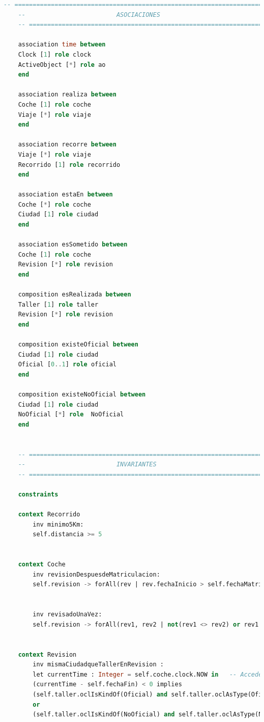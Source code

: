 \documentclass[12pt.a4paper]{article}
\begin{document}
\begin{lstlisting}[style = useNormal,language=SQL, caption={Modelo de Sistema de Coches en USE}]
    -- =====================================================================
    --                         ASOCIACIONES 
    -- =====================================================================
    
    association time between
    Clock [1] role clock
    ActiveObject [*] role ao
    end
    
    association realiza between
    Coche [1] role coche
    Viaje [*] role viaje
    end
    
    association recorre between
    Viaje [*] role viaje
    Recorrido [1] role recorrido
    end
    
    association estaEn between
    Coche [*] role coche
    Ciudad [1] role ciudad
    end
    
    association esSometido between
    Coche [1] role coche
    Revision [*] role revision
    end
    
    composition esRealizada between
    Taller [1] role taller
    Revision [*] role revision
    end
    
    composition existeOficial between
    Ciudad [1] role ciudad
    Oficial [0..1] role oficial
    end
    
    composition existeNoOficial between
    Ciudad [1] role ciudad
    NoOficial [*] role  NoOficial
    end
    
    
    -- =====================================================================
    --                         INVARIANTES
    -- =====================================================================
    
    constraints
    
    context Recorrido
        inv minimo5Km:
        self.distancia >= 5
    
    
    context Coche
        inv revisionDespuesdeMatriculacion:
        self.revision -> forAll(rev | rev.fechaInicio > self.fechaMatriculacion)
    
    
        inv revisadoUnaVez:
        self.revision -> forAll(rev1, rev2 | not(rev1 <> rev2) or rev1.fechaInicio <> rev2.fechaInicio and (rev1.fechaInicio >= rev2.fechaFin or rev2.fechaInicio >= rev1.fechaFin))
    
    
    context Revision
        inv mismaCiudadqueTallerEnRevision :
        let currentTime : Integer = self.coche.clock.NOW in   -- Accede al tiempo actual
        (currentTime - self.fechaFin) < 0 implies
        (self.taller.oclIsKindOf(Oficial) and self.taller.oclAsType(Oficial).ciudad = self.coche.ciudad) --
        or 
        (self.taller.oclIsKindOf(NoOficial) and self.taller.oclAsType(NoOficial).ciudad = self.coche.ciudad) --
        

\end{lstlisting}
\end{document}

